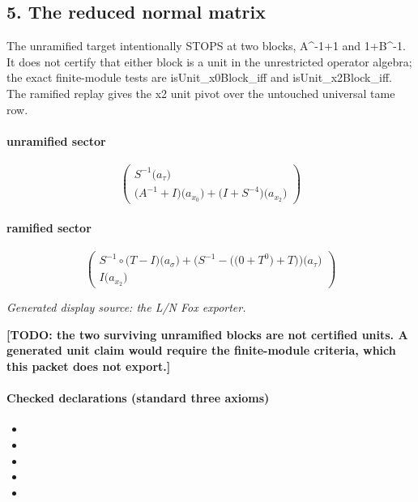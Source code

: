 \subsection*{5. The reduced normal matrix}
The unramified target intentionally STOPS at two blocks, A\textasciicircum{}-1+1 and 1+B\textasciicircum{}-1. It does not certify that either block is a unit in the unrestricted operator algebra; the exact finite-module tests are isUnit\_x0Block\_iff and isUnit\_x2Block\_iff. The ramified replay gives the x2 unit pivot over the untouched universal tame row.

\paragraph{unramified sector}
\[\begin{pmatrix}S^{-1}\bigl(a_{\tau}\bigr)\\\bigl(A^{-1}+I\bigr)\bigl(a_{x_{0}}\bigr)+\bigl(I+S^{-4}\bigr)\bigl(a_{x_{2}}\bigr)\end{pmatrix}\]
\paragraph{ramified sector}
\[\begin{pmatrix}S^{-1}\circ \bigl(T-I\bigr)\bigl(a_{\sigma}\bigr)+\bigl(S^{-1}-\bigl(\bigl(0+T^{0}\bigr)+T\bigr)\bigr)\bigl(a_{\tau}\bigr)\\I\bigl(a_{x_{2}}\bigr)\end{pmatrix}\]
\par\noindent\emph{Generated display source: the L/N Fox exporter.}
\par\noindent\textbf{[TODO: the two surviving unramified blocks are not certified units. A generated unit claim would require the finite-module criteria, which this packet does not export.]}
\paragraph{Checked declarations (standard three axioms)}
\begin{itemize}
\item {}
\item {}
\item {}
\item {}
\item {}
\end{itemize}

